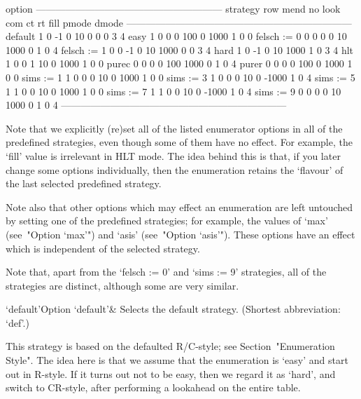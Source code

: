 \begintt
                               option
            ---------------------------------------------------------
strategy    row  mend  no  look  com    ct     rt  fill  pmode  dmode
---------------------------------------------------------------------
default       1     0  -1     0   10     0      0     0      3      4
easy          1     0   0     0  100     0   1000     1      0      0
felsch := 0   0     0   0     0   10  1000      0     1      0      4
felsch := 1   0     0  -1     0   10  1000      0     0      3      4
hard          1     0  -1     0   10  1000      1     0      3      4
hlt           1     0   0     1   10     0   1000     1      0      0
purec         0     0   0     0  100  1000      0     1      0      4
purer         0     0   0     0  100     0   1000     1      0      0
sims := 1     1     0   0     0   10     0   1000     1      0      0
sims := 3     1     0   0     0   10     0  -1000     1      0      4
sims := 5     1     1   0     0   10     0   1000     1      0      0
sims := 7     1     1   0     0   10     0  -1000     1      0      4
sims := 9     0     0   0     0   10  1000      0     1      0      4
---------------------------------------------------------------------
\endtt

Note that we explicitly (re)set all of the listed  enumerator  options
in all of the predefined strategies, even though some of them have  no
effect. For example, the `fill' value is irrelevant in HLT  mode.  The
idea  behind  this  is  that,  if  you  later  change   some   options
individually, then the enumeration retains the  \lq{}flavour'  of  the
last selected predefined strategy.

Note also that other options which may effect an enumeration are  left
untouched by setting one of the predefined  strategies;  for  example,
the values of  `max'  (see~"Option  `max'")  and  `asis'  (see~"Option
`asis'"). These options have an effect which  is  independent  of  the
selected strategy.

Note that, apart from the `felsch := 0' and `sims  :=  9'  strategies,
all of the strategies are distinct, although some are very similar.


\beginitems

\>`default'{Option `default'}&
Selects the default strategy. (Shortest abbreviation: `def'.)

This   strategy   is   based   on   the   defaulted   R/C-style;   see
Section~"Enumeration Style". The idea here is that we assume that  the
enumeration is \lq{}easy' and start out in R-style. If  it  turns  out
not to be easy, then  we  regard  it  as  \lq{}hard',  and  switch  to
CR-style, after performing a lookahead on the entire table.


